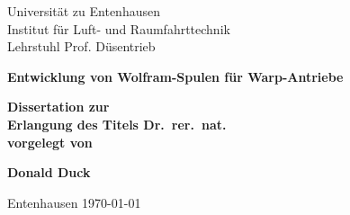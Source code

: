 \begin{titlepage}
Universität zu Entenhausen \\
Institut für Luft- und Raumfahrttechnik \\
Lehrstuhl Prof. Düsentrieb

\vspace*{4cm}

\begin{center}
\huge\bfseries Entwicklung von Wolfram-Spulen für Warp-Antriebe
\end{center}

\vspace*{4cm}

\begin{center}
\large\bfseries Dissertation zur \\ Erlangung des Titels Dr.~rer.~nat. \\ vorgelegt von
\end{center}

\vspace*{2cm}

\begin{center}
\Large\bfseries Donald Duck
\end{center}

\vfill
Entenhausen \hfill \today 
\end{titlepage}